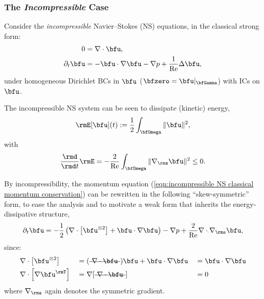\subsubsection*{The \emph{Incompressible} Case}
    Consider the \emph{incompressible} Navier--Stokes (NS) equations, in the classical strong form:
    \begin{align}
                       0  &=  \nabla\cdot\bfu,  \label{eqn:incompressible NS mass conservation}  \\
        \partial_{t}\bfu  &=  - \bfu\cdot\nabla\bfu - \nabla p + \frac{1}{\rmRe}\Delta\bfu,  \label{eqn:incompressible NS classical momentum conservation}
    \end{align}
    under homogeneous Dirichlet BCs in $\bfu$ ($\bfzero  =  \bfu|_{\bfGamma}$) with ICs on $\bfu$.
    
    \shortline

    The incompressible NS system can be seen to dissipate (kinetic) energy,
    \begin{equation}\label{eqn:incompressible NS energy definition}
        \rmE[\bfu](t)  :=  \frac{1}{2}\int_{\bfOmega}\|\bfu\|^{2},
    \end{equation}
    with
    \begin{equation}
        \frac{\rmd}{\rmd t}\rmE  =  - \frac{2}{\rmRe}\int_{\bfOmega}\|\nabla_{\rms}\bfu\|^{2}  \leq  0.
    \end{equation}

    \shortline

    By incompressibility, the momentum equation (\ref{eqn:incompressible NS classical momentum conservation}) can be rewritten in the following ``skew-symmetric'' form, to ease the analysis and to motivate a weak form that inherits the energy-dissipative structure,
    \begin{equation}\label{eqn:incompressible NS skew-symmetric momentum equation}
        \partial_{t}\bfu  =  - \frac{1}{2}\left(\nabla\cdot\left[\bfu^{\otimes 2}\right] + \bfu\cdot\nabla\bfu\right) - \nabla p + \frac{2}{\rmRe}\nabla\cdot\nabla_{\rms}\bfu,
    \end{equation}
    since:
    \begin{align}
        &\nabla\cdot\left[\bfu^{\otimes 2}\right]   &&=  (\mst{\nabla\cdot\bfu})\bfu + \bfu\cdot\nabla\bfu  &&=  \bfu\cdot\nabla\bfu  \\
        &\nabla\cdot\left[\nabla\bfu^{\rmT}\right]  &&=  \nabla[\mst{\nabla\cdot\bfu}]                      &&=  0
    \end{align}
    where $\nabla_{\rms}$ again denotes the symmetric gradient.

